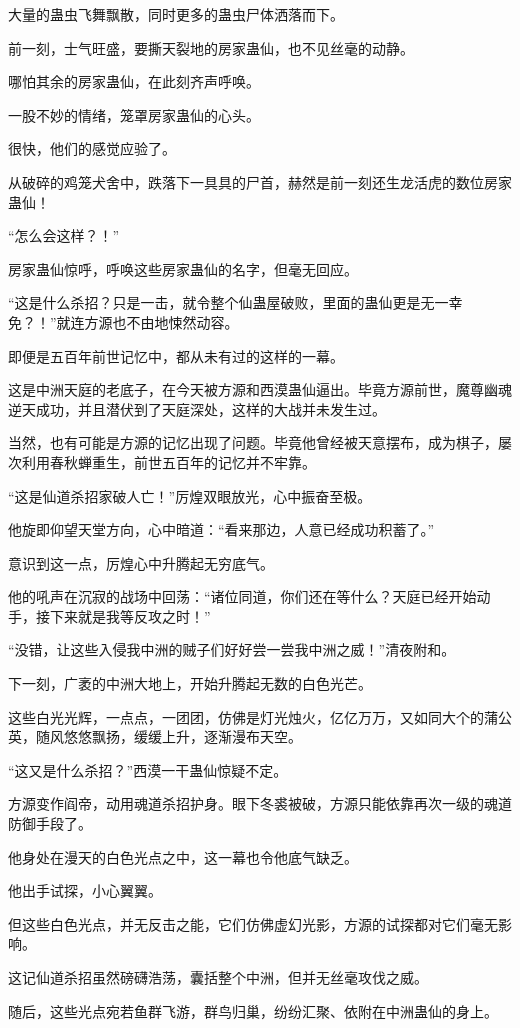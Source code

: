 \begin{this_body}
大量的蛊虫飞舞飘散，同时更多的蛊虫尸体洒落而下。

前一刻，士气旺盛，要撕天裂地的房家蛊仙，也不见丝毫的动静。

哪怕其余的房家蛊仙，在此刻齐声呼唤。

一股不妙的情绪，笼罩房家蛊仙的心头。

很快，他们的感觉应验了。

从破碎的鸡笼犬舍中，跌落下一具具的尸首，赫然是前一刻还生龙活虎的数位房家蛊仙！

“怎么会这样？！”

房家蛊仙惊呼，呼唤这些房家蛊仙的名字，但毫无回应。

“这是什么杀招？只是一击，就令整个仙蛊屋破败，里面的蛊仙更是无一幸免？！”就连方源也不由地悚然动容。

即便是五百年前世记忆中，都从未有过的这样的一幕。

这是中洲天庭的老底子，在今天被方源和西漠蛊仙逼出。毕竟方源前世，魔尊幽魂逆天成功，并且潜伏到了天庭深处，这样的大战并未发生过。

当然，也有可能是方源的记忆出现了问题。毕竟他曾经被天意摆布，成为棋子，屡次利用春秋蝉重生，前世五百年的记忆并不牢靠。

“这是仙道杀招家破人亡！”厉煌双眼放光，心中振奋至极。

他旋即仰望天堂方向，心中暗道：“看来那边，人意已经成功积蓄了。”

意识到这一点，厉煌心中升腾起无穷底气。

他的吼声在沉寂的战场中回荡：“诸位同道，你们还在等什么？天庭已经开始动手，接下来就是我等反攻之时！”

“没错，让这些入侵我中洲的贼子们好好尝一尝我中洲之威！”清夜附和。

下一刻，广袤的中洲大地上，开始升腾起无数的白色光芒。

这些白光光辉，一点点，一团团，仿佛是灯光烛火，亿亿万万，又如同大个的蒲公英，随风悠悠飘扬，缓缓上升，逐渐漫布天空。

“这又是什么杀招？”西漠一干蛊仙惊疑不定。

方源变作阎帝，动用魂道杀招护身。眼下冬裘被破，方源只能依靠再次一级的魂道防御手段了。

他身处在漫天的白色光点之中，这一幕也令他底气缺乏。

他出手试探，小心翼翼。

但这些白色光点，并无反击之能，它们仿佛虚幻光影，方源的试探都对它们毫无影响。

这记仙道杀招虽然磅礴浩荡，囊括整个中洲，但并无丝毫攻伐之威。

随后，这些光点宛若鱼群飞游，群鸟归巢，纷纷汇聚、依附在中洲蛊仙的身上。


\end{this_body}
